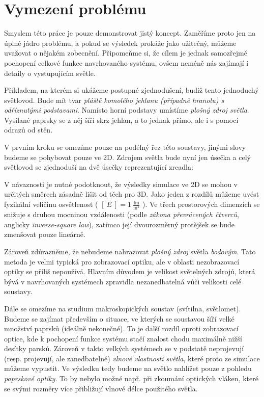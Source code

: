 \section{Vymezení problému}

Smyslem této práce je pouze demonstrovat jistý koncept. Zaměříme proto jen na úplné jádro problému, a pokud se výsledek prokáže jako užitečný, můžeme uvažovat o nějakém zobecnění. Připomeňme si, že cílem je jednak samozřejmě pochopení celkové funkce navrhovaného systému, ovšem neméně nás zajímají i detaily o vystupujícím světle.

Příkladem, na kterém si ukážeme postupné zjednodušení, budiž tento jednoduchý světlovod. Bude mít tvar \emph{pláště komolého jehlanu (případně hranolu) s odříznutými podstavami}. Namísto horní podstavy umístíme \emph{plošný zdroj světla}. Vysílané paprsky se z něj šíří skrz jehlan, a to jednak přímo, ale i s pomocí odrazů od stěn.

V prvním kroku se omezíme pouze na podélný řez této soustavy, jinými slovy budeme se pohybovat pouze ve 2D. Zdrojem světla bude nyní jen úsečka a celý světlovod se zjednoduší na dvě úsečky reprezentující zrcadla:


V návaznosti je nutné podotknout, že výsledky simulace ve 2D se mohou v určitých směrech zásadně lišit od těch pro 3D. Jako jeden z rozdílů můžeme uvést fyzikální veličinu osvětlenost ( $ [\ E\ ] = 1 \ \mathrm{\frac{lm}{m^2}} $ ). Ve třech prostorových dimenzích se snižuje s druhou mocninou vzdálenosti (podle \emph{zákona převrácených čtverců}, anglicky \emph{inverse-square law}), zatímco její dvourozměrný protějšek se bude zmenšovat pouze lineárně.

Zároveň zdůrazněme, že nebudeme nahrazovat \emph{plošný zdroj} světla \emph{bodovým}. Tato metoda je velmi typická pro zobrazovací optiku, ale v oblasti nezobrazovací optiky se příliš nepoužívá. Hlavním důvodem je velikost světelných zdrojů, která bývá v navrhovaných systémech zpravidla nezanedbatelná vůči velikosti celé soustavy.

Dále se omezíme na studium makroskopických soustav (svítilna, světlomet). Budeme se zajímat především o situace, ve kterých se soustavou šíří velké množství paprsků (ideálně nekonečné). To je další rozdíl oproti zobrazovací optice, kde k pochopení funkce systému stačí znalost chodu maximálně nižší desítky parsků. Zároveň v takto velkých systémech se v podstatě neprojevují (resp. projevují, ale zanedbatelně) \emph{vlnové vlastnosti světla}, které proto ze simulace můžeme vypustit. Ve výsledku tedy budeme na světlo nahlížet pouze z pohledu \emph{paprskové optiky}. To by nebylo možné např. při zkoumání optických vláken, které se svými rozměry více přibližují vlnové délce použitého světla.


